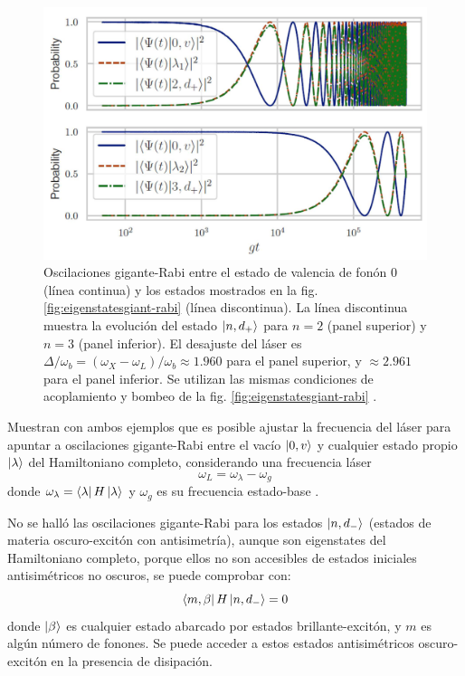\documentclass[../main.tex]{subfiles}
\begin{document}
\begin{figure}[th]
	\centering
	\includegraphics[width=0.7\linewidth]{img/EigenstatesGiant-Rabi1}
	\caption{Oscilaciones gigante-Rabi entre el estado de valencia de fonón $0$ (línea continua) y los estados mostrados en la fig. \ref{fig:eigenstatesgiant-rabi} (línea discontinua). La línea discontinua muestra la evolución del estado $\ket{n,d_+}$ para $n = 2$ (panel superior) y $n = 3$ (panel inferior). El desajuste del láser es $\Delta/\omega_b = (\omega_X-\omega_L)/\omega_b \approx 1.960$ para el panel superior, y $\approx 2.961$ para el panel inferior. Se utilizan las mismas condiciones de acoplamiento y bombeo de la fig. \ref{fig:eigenstatesgiant-rabi} \parencite{Vargas2022}.}
	\label{fig:eigenstatesgiant-rabi1}
\end{figure}

Muestran con ambos ejemplos que es posible ajustar la frecuencia del láser para apuntar a oscilaciones gigante-Rabi entre el vacío $\ket{0,v}$ y cualquier estado propio $\ket{\lambda}$ del Hamiltoniano completo, considerando una frecuencia láser
\begin{equation}
	\omega_L = \omega_\lambda - \omega_g
\end{equation}
donde $\omega_\lambda = \bra{\lambda}H\ket{\lambda}$ y $\omega_g$ es su frecuencia estado-base \parencite{Bin2020}. 

No se halló las oscilaciones gigante-Rabi para los estados $\ket{n,d_-}$ (estados de materia oscuro-excitón con antisimetría), aunque son eigenstates del Hamiltoniano completo, porque ellos no son accesibles de estados iniciales antisimétricos no oscuros, se puede comprobar con:
\begin{equation}
	\bra{m,\beta}H\ket{n,d_-} = 0
\end{equation}
donde $\ket{\beta}$ es cualquier estado abarcado por estados brillante-excitón, y $m$ es algún número de fonones. Se puede acceder a estos estados antisimétricos oscuro-excitón en la presencia de disipación.
\end{document}
